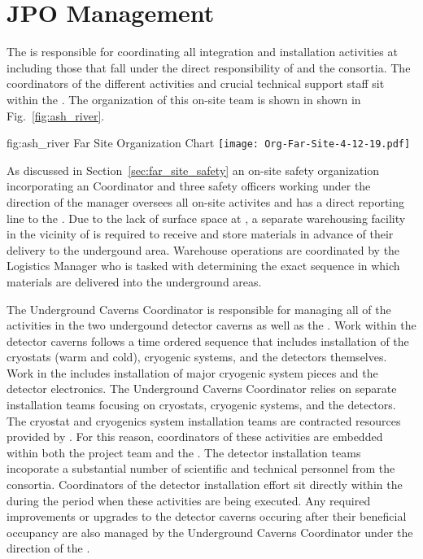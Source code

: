 \section{JPO Management}
\label{vl:tc-facility_mgmt}

The  is responsible for coordinating all integration and
installation activities at  including those that fall 
under the direct responsibility of  and the  
consortia.  The coordinators of the different activities and crucial 
technical support staff sit within the .  The organization
of this on-site team is shown in shown in Fig.~\ref{fig:ash_river}.  

\begin{dunefigure}{fig:ash_river}
  {Far Site Organization Chart}
  \texttt{[image: Org-Far-Site-4-12-19.pdf]}
\end{dunefigure}
 
As discussed in Section~\ref{sec:far_site_safety} an on-site safety 
organization incorporating an  Coordinator and three 
safety officers working under the direction of the  
 manager oversees all on-site activites and has a direct 
reporting line to the .  Due to the lack of surface space 
at , a separate warehousing facility in the vicinity of 
 is required to receive and store materials in advance 
of their delivery to the undergound area.  Warehouse operations are 
coordinated by the  Logistics Manager who is tasked 
with determining the exact sequence in which materials are delivered
into the underground areas.         

The Underground Caverns Coordinator is responsible for managing all 
of the activities in the two undergound detector caverns as well as 
the .  Work within the detector caverns follows a time 
ordered sequence that includes installation of the cryostats (warm
and cold), cryogenic systems, and the detectors themselves.  Work 
in the  includes installation of major cryogenic system 
pieces and the detector  electronics.  The Underground 
Caverns Coordinator relies on separate installation teams focusing 
on cryostats, cryogenic systems, and the detectors.  The cryostat 
and cryogenics system installation teams are contracted resources 
provided by .  For this reason, coordinators of these 
activities are embedded within both the  project team 
and the .  The detector installation teams incoporate a 
substantial number of scientific and technical personnel from the 
 consortia.  Coordinators of the detector installation 
effort sit directly within the  during the period when 
these activities are being executed.  Any required improvements or 
upgrades to the detector caverns occuring after their beneficial 
occupancy are also managed by the Underground Caverns Coordinator 
under the direction of the .


